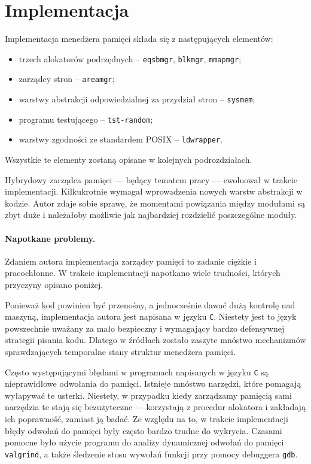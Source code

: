 \documentclass[12pt,a4paper,titlepage,twoside]{mwart}
\begin{document}
\newpage


\section{Implementacja}
\hypertarget{Implementacja}{}

Implementacja menedżera pamięci składa się z następujących elementów:
\begin{itemize}
\item trzech alokatorów podrzędnych -- \verb+eqsbmgr+, \verb+blkmgr+, \verb+mmapmgr+;
\item zarządcy stron -- \verb+areamgr+;
\item warstwy abstrakcji odpowiedzialnej za przydział stron -- \verb+sysmem+;
\item programu testującego -- \verb+tst-random+;
\item warstwy zgodności ze standardem POSIX -- \verb+ldwrapper+.
\end{itemize}
Wszystkie te elementy zostaną opisane w kolejnych podrozdziałach.

\vspace{1ex}

Hybrydowy zarządca pamięci --- będący tematem pracy --- ewoluował w trakcie
implementacji.  Kilkukrotnie wymagał wprowadzenia nowych warstw abstrakcji w
kodzie. Autor zdaje sobie sprawę, że momentami powiązania między modułami są
zbyt duże i należałoby możliwie jak najbardziej rozdzielić poszczególne
moduły.

\paragraph{Napotkane problemy.} Zdaniem autora implementacja zarządcy pamięci
to zadanie ciężkie i pracochłonne. W trakcie implementacji napotkano wiele
trudności, których przyczyny opisano poniżej.

Ponieważ kod powinien być przenośny, a jednocześnie dawać dużą kontrolę nad
maszyną, implementacja autora jest napisana w języku \verb+C+.  Niestety jest
to język powszechnie uważany za mało bezpieczny i wymagający bardzo defensywnej
strategii pisania kodu. Dlatego w źródłach zostało zaszyte mnóstwo mechanizmów
sprawdzających temporalne stany struktur menedżera pamięci.
	
Często występującymi błędami w programach napisanych w języku \verb+C+ są
nieprawidłowe odwołania do pamięci. Istnieje mnóstwo narzędzi, które pomagają
wyłapywać te usterki. Niestety, w przypadku kiedy zarządzamy pamięcią sami
narzędzia te stają się bezużyteczne --- korzystają z procedur alokatora i
zakładają ich poprawność, zamiast ją badać. Ze względu na to, w trakcie
implementacji błędy odwołań do pamięci były często bardzo trudne do wykrycia.
Czasami pomocne było użycie programu do analizy dynamicznej odwołań do pamięci
\verb+valgrind+, a także śledzenie stosu wywołań funkcji przy pomocy debuggera
\verb+gdb+.
\end{document}
